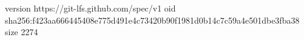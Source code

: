 version https://git-lfs.github.com/spec/v1
oid sha256:f423aa666445408e775d491e4c73420b90f1981d0b14c7c59a4e501dbe3fba38
size 2274
